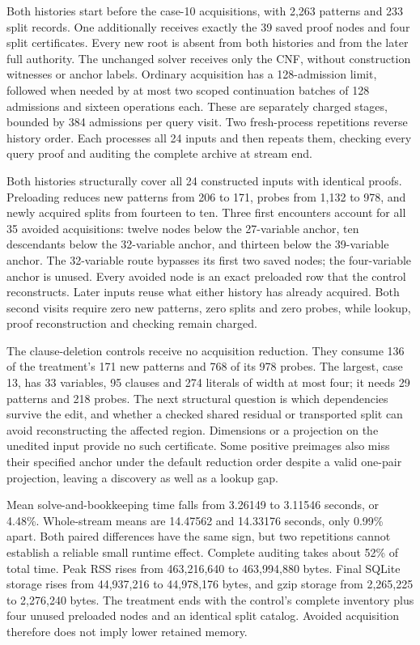 \documentclass[11pt,a4paper]{article}
\numberwithin{equation}{section}
\theoremstyle{plain}
\theoremstyle{definition}
\theoremstyle{remark}
\begin{document}
Both histories start before the case-10 acquisitions, with 2,263 patterns and
233 split records. One additionally receives exactly the 39 saved proof nodes
and four split certificates. Every new root is absent from both histories and
from the later full authority. The unchanged solver receives only the CNF,
without construction witnesses or anchor labels. Ordinary acquisition has a
128-admission limit, followed when needed by at most two scoped continuation
batches of 128 admissions and sixteen operations each. These are separately
charged stages, bounded by 384 admissions per query visit. Two fresh-process
repetitions reverse history order. Each processes all 24 inputs and then repeats
them, checking every query proof and auditing the complete archive at stream end.

Both histories structurally cover all 24 constructed inputs with identical
proofs. Preloading reduces new patterns from 206 to 171, probes from 1,132 to
978, and newly acquired splits from fourteen to ten. Three first encounters
account for all 35 avoided acquisitions: twelve nodes below the 27-variable
anchor, ten descendants below the 32-variable anchor, and thirteen below the
39-variable anchor. The 32-variable route bypasses its first two saved nodes;
the four-variable anchor is unused. Every avoided node is an exact preloaded
row that the control reconstructs. Later inputs reuse what either history has
already acquired. Both second visits require zero new patterns, zero splits
and zero probes, while lookup, proof reconstruction and checking remain charged.

The clause-deletion controls receive no acquisition reduction. They consume
136 of the treatment's 171 new patterns and 768 of its 978 probes. The largest,
case 13, has 33 variables, 95 clauses and 274 literals of width at most four;
it needs 29 patterns and 218 probes. The next structural question is which
dependencies survive the edit, and whether a checked shared residual or
transported split can avoid reconstructing the affected region. Dimensions or
a projection on the unedited input provide no such certificate. Some positive
preimages also miss their specified anchor under the default reduction order
despite a valid one-pair projection, leaving a discovery as well as a lookup gap.

Mean solve-and-bookkeeping time falls from 3.26149 to 3.11546 seconds, or 4.48\%.
Whole-stream means are 14.47562 and 14.33176 seconds, only 0.99\% apart. Both
paired differences have the same sign, but two repetitions cannot establish a
reliable small runtime effect. Complete auditing takes about 52\% of total time.
Peak RSS rises from 463,216,640 to 463,994,880 bytes. Final SQLite storage rises
from 44,937,216 to 44,978,176 bytes, and gzip storage from 2,265,225 to 2,276,240
bytes. The treatment ends with the control's complete inventory plus four
unused preloaded nodes and an identical split catalog. Avoided acquisition
therefore does not imply lower retained memory.
\end{document}
